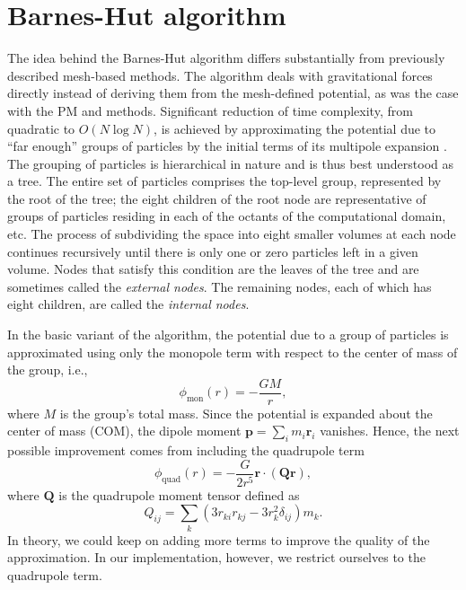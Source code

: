 \chapter{Barnes-Hut algorithm}
The idea behind the Barnes-Hut algorithm differs substantially from previously described mesh-based methods.
The algorithm deals with gravitational forces directly instead of deriving them from the mesh-defined potential, as was the case with the PM and \PThreeM{} methods.
Significant reduction of time complexity, from quadratic to $O(N \log N)$, is achieved by approximating the potential due to ``far enough'' groups of particles by the initial terms of its multipole expansion \cite{trenti2008gravitationalnbodysimulations}.
The grouping of particles is hierarchical in nature and is thus best understood as a tree.
The entire set of particles comprises the top-level group, represented by the root of the tree;
the eight children of the root node are representative of groups of particles residing in each of the octants of the computational domain, etc.
The process of subdividing the space into eight smaller volumes at each node continues recursively until there is only one or zero particles left in a given volume.
Nodes that satisfy this condition are the leaves of the tree and are sometimes called the \textit{external nodes}.
The remaining nodes, each of which has eight children, are called the \textit{internal nodes}.

In the basic variant of the algorithm, the potential due to a group of particles is approximated using only the monopole term with respect to the center of mass of the group, i.e.,
\begin{equation*}
    \phi_\text{mon}(r) = -\frac{GM}{r},
\end{equation*}
where $M$ is the group's total mass.
Since the potential is expanded about the center of mass (COM), the dipole moment $\mathbf{p} = \sum_{i} m_i \mathbf{r}_i$ vanishes.
Hence, the next possible improvement comes from including the quadrupole term
\begin{equation*}
    \phi_\text{quad}(r) = -\frac{G}{2r^5} \mathbf{r} \cdot (\mathbf{Q} \mathbf{r}),
\end{equation*}
where $\mathbf{Q}$ is the quadrupole moment tensor defined as
\begin{equation*}
    Q_{ij} = \sum_{k} (3r_{ki}r_{kj} - 3r_k^2\delta_{ij})m_k.
\end{equation*}
In theory, we could keep on adding more terms to improve the quality of the approximation.
In our implementation, however, we restrict ourselves to the quadrupole term.




